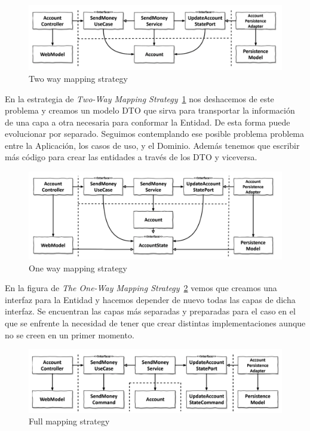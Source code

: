 \begin{figure}[H]
    \centering
    \includegraphics[height=0.1\textheight]{./part/Ejecucion/Seguimiento/CreateTaskUseCase/img/twowaymapping}
    \caption{Two way mapping strategy~\cite{TomHombergs2019GYHD}}\label{fig:twowaymapping}
\end{figure}

En la estrategia de \textit{Two-Way Mapping Strategy}~\cref{fig:twowaymapping} nos deshacemos de este problema y creamos un modelo DTO que sirva para transportar la información de una capa a otra necesaria para conformar la Entidad.
De esta forma puede evolucionar por separado.
Seguimos contemplando ese posible problema problema entre la Aplicación, los casos de uso, y el Dominio.
Además tenemos que escribir más código para crear las entidades a través de los DTO y viceversa.

\begin{figure}[H]
    \centering
    \includegraphics[height=0.1\textheight]{./part/Ejecucion/Seguimiento/CreateTaskUseCase/img/onWaymapping}
    \caption{One way mapping strategy~\cite{TomHombergs2019GYHD}}\label{fig:onWaymapping}
\end{figure}

En la figura de \textit{The One-Way Mapping Strategy}~\cref{fig:onWaymapping} vemos que creamos una interfaz para la Entidad y hacemos depender de nuevo todas las capas de dicha interfaz.
Se encuentran las capas más separadas y preparadas para el caso en el que se enfrente la necesidad de tener que crear distintas implementaciones aunque no se creen en un primer momento.

\begin{figure}[H]
    \centering
    \includegraphics[height=0.1\textheight]{./part/Ejecucion/Seguimiento/CreateTaskUseCase/img/fullmapping}
    \caption{Full mapping strategy~\cite{TomHombergs2019GYHD}}\label{fig:fullmapping}
\end{figure}

